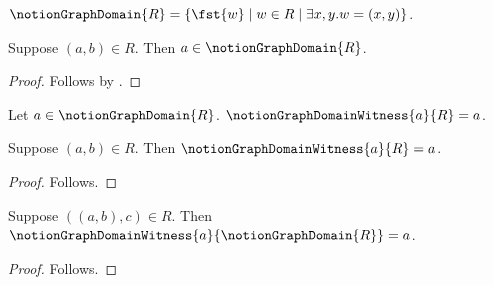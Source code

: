 

\begin{definition}\label{notion_graph_domain}
    $\notionGraphDomain{R}
        =\{\fst{w}\mid w\in R\mid \exists x,y. w=(x,y)\}$.
\end{definition}

\begin{classification}\label{notion_graph_domain_intro}
    Suppose $(a,b)\in R$.
    Then $a\in\notionGraphDomain{R}$.
\end{classification}
\begin{proof}
    Follows by .
\end{proof}

\begin{definition}\label{notion_graph_domain_witness}
    Let $a\in\notionGraphDomain{R}$.
    $\notionGraphDomainWitness{a}{R}=a$.
\end{definition}

\begin{proposition}\label{notion_graph_domain_direct}
    Suppose $(a,b)\in R$.
    Then $\notionGraphDomainWitness{a}{R}=a$.
\end{proposition}
\begin{proof}
    Follows.
\end{proof}

\begin{proposition}\label{notion_graph_domain_nested}
    Suppose $((a,b),c)\in R$.
    Then $\notionGraphDomainWitness{a}{\notionGraphDomain{R}}=a$.
\end{proposition}
\begin{proof}
    Follows.
\end{proof}
